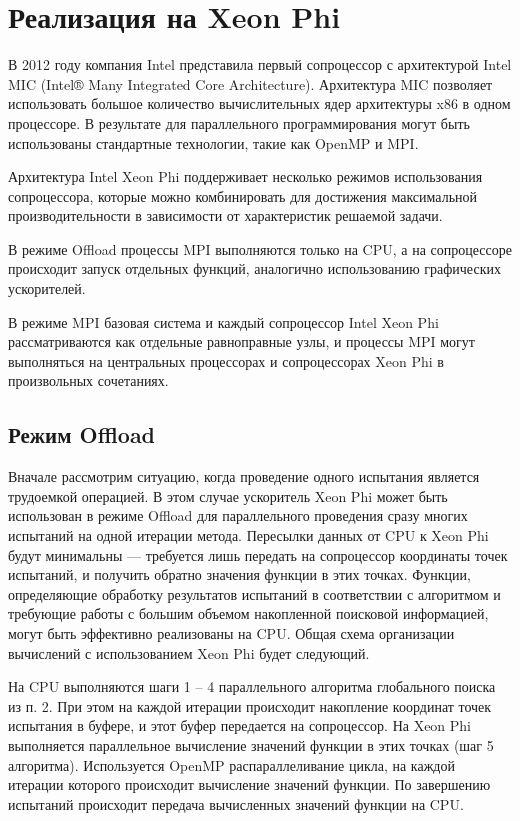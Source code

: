 \section{Реализация на Xeon Phi}
В 2012 году компания Intel представила первый сопроцессор с архитектурой Intel MIC (Intel® Many Integrated Core Architecture). Архитектура MIC позволяет использовать большое количество вычислительных ядер архитектуры x86 в одном процессоре. В результате для параллельного программирования могут быть использованы стандартные технологии, такие как OpenMP и MPI. 
\par
Архитектура Intel Xeon Phi поддерживает несколько режимов использования сопроцессора, которые можно комбинировать для достижения максимальной производительности в зависимости от характеристик решаемой задачи.
\par
В режиме Offload процессы MPI выполняются только на CPU, а на сопроцессоре происходит запуск отдельных функций, аналогично использованию графических ускорителей.
\par
В режиме MPI базовая система и каждый сопроцессор Intel Xeon Phi рассматриваются как отдельные равноправные узлы, и процессы MPI могут выполняться на центральных процессорах и сопроцессорах Xeon Phi в произвольных сочетаниях.
\subsection{Режим Offload}
Вначале рассмотрим ситуацию, когда проведение одного испытания является трудоемкой операцией. В этом случае ускоритель Xeon Phi может быть использован в режиме Offload для параллельного проведения сразу многих испытаний на одной итерации метода. Пересылки данных от CPU к Xeon Phi будут минимальны --- требуется лишь передать на сопроцессор координаты точек испытаний, и получить обратно значения функции в этих точках. Функции, определяющие обработку результатов испытаний в соответствии с алгоритмом и требующие работы с большим объемом накопленной поисковой информацией, могут быть эффективно реализованы на CPU. Общая схема организации вычислений с использованием Xeon Phi будет следующий.
\par
На CPU выполняются шаги 1 – 4 параллельного алгоритма глобального поиска из п. 2. При этом на каждой итерации происходит накопление координат точек испытания в буфере, и этот буфер передается на сопроцессор. На Xeon Phi выполняется параллельное вычисление значений функции в этих точках (шаг 5 алгоритма). Используется OpenMP распараллеливание цикла, на каждой итерации которого происходит вычисление значений функции. По завершению испытаний происходит передача вычисленных значений функции на CPU. 
